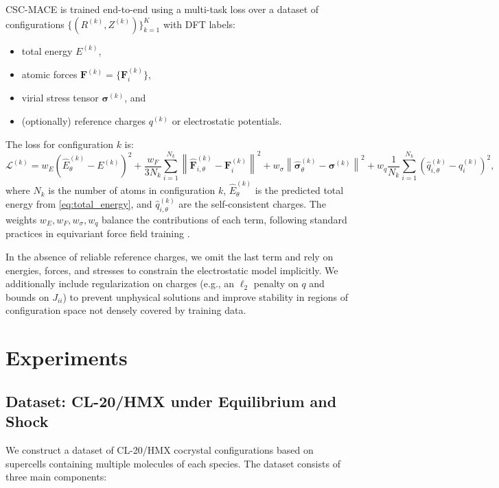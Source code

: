 \documentclass{article}
\begin{document}
CSC-MACE is trained end-to-end using a multi-task loss over a dataset of configurations $\{(R^{(k)}, Z^{(k)})\}_{k=1}^K$ with DFT labels:
\begin{itemize}
    \item total energy $E^{(k)}$,
    \item atomic forces $\mathbf{F}^{(k)} = \{\mathbf{F}_i^{(k)}\}$,
    \item virial stress tensor $\boldsymbol{\sigma}^{(k)}$, and
    \item (optionally) reference charges $q^{(k)}$ or electrostatic potentials.
\end{itemize}

The loss for configuration $k$ is:
\begin{equation}
    \mathcal{L}^{(k)} =
    w_E \left( \hat{E}_\theta^{(k)} - E^{(k)} \right)^2
    + \frac{w_F}{3 N_k} \sum_{i=1}^{N_k} \left\| \hat{\mathbf{F}}_{i,\theta}^{(k)} - \mathbf{F}_i^{(k)} \right\|^2
    + w_\sigma \left\| \hat{\boldsymbol{\sigma}}_\theta^{(k)} - \boldsymbol{\sigma}^{(k)} \right\|^2
    + w_q \frac{1}{N_k} \sum_{i=1}^{N_k} \left( \hat{q}_{i,\theta}^{(k)} - q_i^{(k)} \right)^2,
\end{equation}
where $N_k$ is the number of atoms in configuration $k$, $\hat{E}_\theta^{(k)}$ is the predicted total energy from \eqref{eq:total_energy}, and $\hat{q}_{i,\theta}^{(k)}$ are the self-consistent charges. The weights $w_E, w_F, w_\sigma, w_q$ balance the contributions of each term, following standard practices in equivariant force field training \cite{batatia2022mace}.

In the absence of reliable reference charges, we omit the last term and rely on energies, forces, and stresses to constrain the electrostatic model implicitly. We additionally include regularization on charges (e.g., an $\ell_2$ penalty on $q$ and bounds on $J_{ii}$) to prevent unphysical solutions and improve stability in regions of configuration space not densely covered by training data.

\section{Experiments}
\label{sec:experiments}

\subsection{Dataset: CL-20/HMX under Equilibrium and Shock}

We construct a dataset of CL-20/HMX cocrystal configurations based on supercells containing multiple molecules of each species. The dataset consists of three main components:
\end{document}
